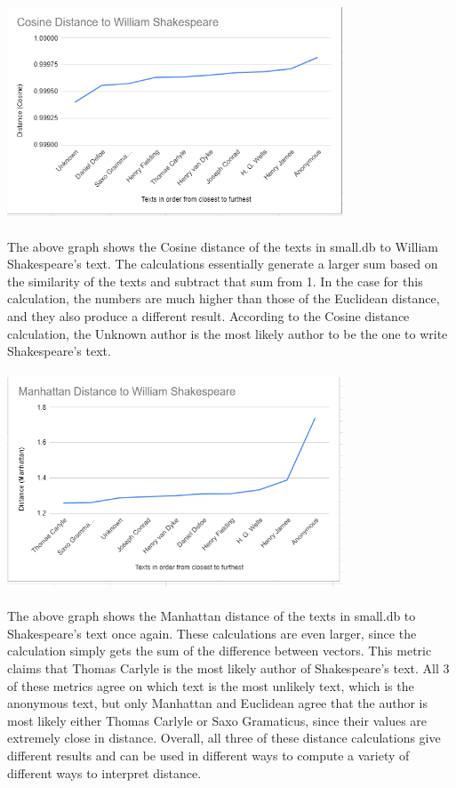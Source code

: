 \documentclass[11pt]{article}
\begin{document}
\includegraphics[width = 0.75\textwidth]{Graphs/Cosine.PNG}
\\ \\
The above graph shows the Cosine distance of the texts in small.db to William Shakespeare's text. The calculations essentially generate a larger sum based on the similarity of the texts and subtract that sum from 1. In the case for this calculation, the numbers are much higher than those of the Euclidean distance, and they also produce a different result. According to the Cosine distance calculation, the Unknown author is the most likely author to be the one to write Shakespeare's text.
\\ \\
\includegraphics[width = 0.75\textwidth]{Graphs/Manhattan.PNG}
\\ \\
The above graph shows the Manhattan distance of the texts in small.db to Shakespeare's text once again. These calculations are even larger, since the calculation simply gets the sum of the difference between vectors. This metric claims that Thomas Carlyle is the most likely author of Shakespeare's text. All 3 of these metrics agree on which text is the most unlikely text, which is the anonymous text, but only Manhattan and Euclidean agree that the author is most likely either Thomas Carlyle or Saxo Gramaticus, since their values are extremely close in distance. Overall, all three of these distance calculations give different results and can be used in different ways to compute a variety of different ways to interpret distance. \\
\end{document}
